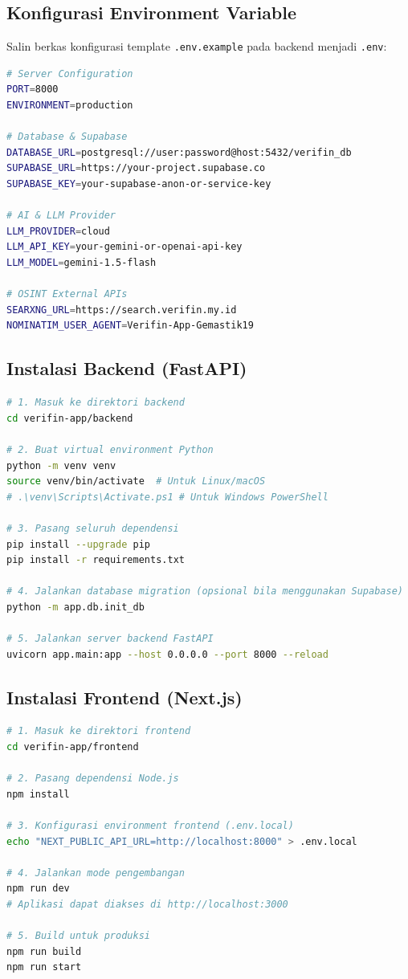 \documentclass[12pt,a4paper]{article}
\begin{document}
\subsection{Konfigurasi Environment Variable}
Salin berkas konfigurasi template \texttt{.env.example} pada backend menjadi \texttt{.env}:
\begin{lstlisting}[language=bash]
# Server Configuration
PORT=8000
ENVIRONMENT=production

# Database & Supabase
DATABASE_URL=postgresql://user:password@host:5432/verifin_db
SUPABASE_URL=https://your-project.supabase.co
SUPABASE_KEY=your-supabase-anon-or-service-key

# AI & LLM Provider
LLM_PROVIDER=cloud
LLM_API_KEY=your-gemini-or-openai-api-key
LLM_MODEL=gemini-1.5-flash

# OSINT External APIs
SEARXNG_URL=https://search.verifin.my.id
NOMINATIM_USER_AGENT=Verifin-App-Gemastik19
\end{lstlisting}

\subsection{Instalasi Backend (FastAPI)}
\begin{lstlisting}[language=bash]
# 1. Masuk ke direktori backend
cd verifin-app/backend

# 2. Buat virtual environment Python
python -m venv venv
source venv/bin/activate  # Untuk Linux/macOS
# .\venv\Scripts\Activate.ps1 # Untuk Windows PowerShell

# 3. Pasang seluruh dependensi
pip install --upgrade pip
pip install -r requirements.txt

# 4. Jalankan database migration (opsional bila menggunakan Supabase)
python -m app.db.init_db

# 5. Jalankan server backend FastAPI
uvicorn app.main:app --host 0.0.0.0 --port 8000 --reload
\end{lstlisting}

\subsection{Instalasi Frontend (Next.js)}
\begin{lstlisting}[language=bash]
# 1. Masuk ke direktori frontend
cd verifin-app/frontend

# 2. Pasang dependensi Node.js
npm install

# 3. Konfigurasi environment frontend (.env.local)
echo "NEXT_PUBLIC_API_URL=http://localhost:8000" > .env.local

# 4. Jalankan mode pengembangan
npm run dev
# Aplikasi dapat diakses di http://localhost:3000

# 5. Build untuk produksi
npm run build
npm run start
\end{lstlisting}
\end{document}
